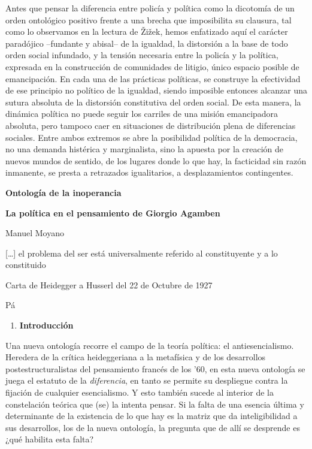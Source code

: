 Antes que pensar la diferencia entre policía y política como la dicotomía de un orden ontológico positivo frente a una brecha que imposibilita su clausura, tal como lo observamos en la lectura de Žižek, hemos enfatizado aquí el carácter paradójico --fundante y abisal-- de la igualdad, la distorsión a la base de todo orden social infundado, y la tensión necesaria entre la policía y la política, expresada en la construcción de comunidades de litigio, único espacio posible de emancipación. En cada una de las prácticas políticas, se construye la efectividad de ese principio no político de la igualdad, siendo imposible entonces alcanzar una sutura absoluta de la distorsión constitutiva del orden social. De esta manera, la dinámica política no puede seguir los carriles de una misión emancipadora absoluta, pero tampoco caer en situaciones de distribución plena de diferencias sociales. Entre ambos extremos se abre la posibilidad política de la democracia, no una demanda histérica y marginalista, sino la apuesta por la creación de nuevos mundos de sentido, de los lugares donde lo que hay, la facticidad sin razón inmanente, se presta a retrazados igualitarios, a desplazamientos contingentes.

\textbf{Ontología de la inoperancia}

\textbf{La política en el pensamiento de Giorgio Agamben}

Manuel Moyano

{[}\ldots{]} el problema del ser está universalmente referido al constituyente y a lo constituido

Carta de Heidegger a Husserl del 22 de Octubre de 1927

Pá

\begin{enumerate}
\def\labelenumi{\arabic{enumi}.}
\item
  \textbf{Introducción}
\end{enumerate}

Una nueva ontología recorre el campo de la teoría política: el antiesencialismo. Heredera de la crítica heideggeriana a la metafísica y de los desarrollos postestructuralistas del pensamiento francés de los '60, en esta nueva ontología se juega el estatuto de la \emph{diferencia}, en tanto se permite su despliegue contra la fijación de cualquier esencialismo. Y esto también sucede al interior de la constelación teórica que (se) la intenta pensar. Si la falta de una esencia última y determinante de la existencia de lo que hay es la matriz que da inteligibilidad a sus desarrollos, los de la nueva ontología, la pregunta que de allí se desprende es ¿qué habilita esta falta?

